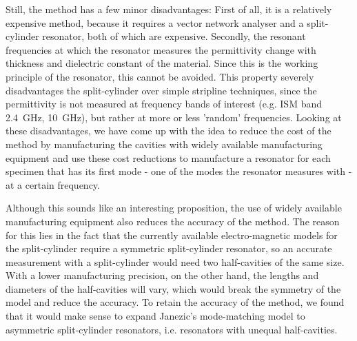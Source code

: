Still, the method has a few minor disadvantages: First of all, it is a relatively expensive method, because it requires a vector network analyser and a split-cylinder resonator, both of which are expensive. Secondly, the resonant frequencies at which the resonator measures the permittivity change with thickness and dielectric constant of the material. Since this is the working principle of the resonator, this cannot be avoided. This property severely disadvantages the split-cylinder over simple stripline techniques, since the permittivity is not measured at frequency bands of interest (e.g. ISM band \SI{2.4}{\giga\hertz}, \SI{10}{\giga\hertz}), but rather at more or less 'random' frequencies. Looking at these disadvantages, we have come up with the idea to reduce the cost of the method by manufacturing the cavities with widely available manufacturing equipment and use these cost reductions to manufacture a resonator for each specimen that has its first \te{} mode - one of the modes the resonator measures with - at a certain frequency.

Although this sounds like an interesting proposition, the use of widely available manufacturing equipment also reduces the accuracy of the method. The reason for this lies in the fact that the currently available electro-magnetic models for the split-cylinder require a symmetric split-cylinder resonator, so an accurate measurement with a split-cylinder would need two half-cavities of the same size. With a lower manufacturing precision, on the other hand, the lengths and diameters of the half-cavities will vary, which would break the symmetry of the model and reduce the accuracy. To retain the accuracy of the method, we found that it would make sense to expand Janezic's mode-matching model to asymmetric split-cylinder resonators, i.e. resonators with unequal half-cavities. 

